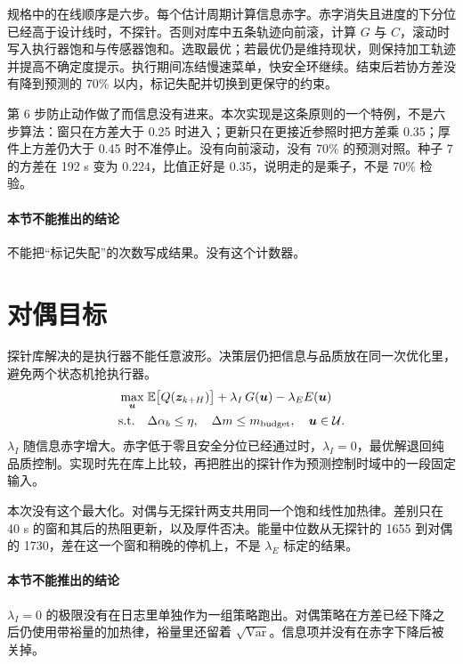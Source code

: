 规格中的在线顺序是六步。每个估计周期计算信息赤字。赤字消失且进度的下分位已经高于设计线时，不探针。否则对库中五条轨迹向前滚，计算 \(G\) 与 \(C\)，滚动时写入执行器饱和与传感器饱和。选取最优；若最优仍是维持现状，则保持加工轨迹并提高不确定度提示。执行期间冻结慢速菜单，快安全环继续。结束后若协方差没有降到预测的 70\% 以内，标记失配并切换到更保守的约束。

第 6 步防止动作做了而信息没有进来。本次实现是这条原则的一个特例，不是六步算法：窗只在方差大于 0.25 时进入；更新只在更接近参照时把方差乘 0.35；厚件上方差仍大于 0.45 时不准停止。没有向前滚动，没有 70\% 的预测对照。种子 7 的方差在 192 s 变为 \(0.224\)，比值正好是 0.35，说明走的是乘子，不是 70\% 检验。

\paragraph{本节不能推出的结论}
不能把“标记失配”的次数写成结果。没有这个计数器。

\section{对偶目标}

探针库解决的是执行器不能任意波形。决策层仍把信息与品质放在同一次优化里，避免两个状态机抢执行器。
\begin{equation}
\label{eq:dual}
\begin{aligned}
\max_{\bm{u}}\;
& \mathbb{E}\big[Q(\bm{z}_{k+H})\big]
+\lambda_I\, G(\bm{u})
-\lambda_E E(\bm{u})\\
\mathrm{s.t.}\quad
& \Delta\alpha_b\le\eta,\quad
\Delta m\le m_{\mathrm{budget}},\quad
\bm{u}\in\mathcal{U}.
\end{aligned}
\end{equation}
\(\lambda_I\) 随信息赤字增大。赤字低于零且安全分位已经通过时，\(\lambda_I=0\)，最优解退回纯品质控制。实现时先在库上比较，再把胜出的探针作为预测控制时域中的一段固定输入。

本次没有这个最大化。对偶与无探针两支共用同一个饱和线性加热律。差别只在 40 s 的窗和其后的热阻更新，以及厚件否决。能量中位数从无探针的 1655 到对偶的 1730，差在这一个窗和稍晚的停机上，不是 \(\lambda_E\) 标定的结果。

\paragraph{本节不能推出的结论}
\(\lambda_I=0\) 的极限没有在日志里单独作为一组策略跑出。对偶策略在方差已经下降之后仍使用带裕量的加热律，裕量里还留着 \(\sqrt{\mathrm{Var}}\)。信息项并没有在赤字下降后被关掉。

